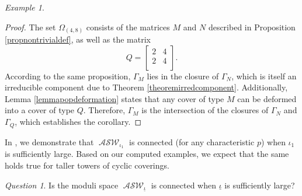 \documentclass{compositio}
\theoremstyle{remark}
\newtheorem{example}[theorem]{Example}
\theoremstyle{remark}
\newtheorem{question}[theorem]{Question}
\DeclareMathOperator{\ASW}{\mathcal{ASW}}
\begin{document}
\begin{example}
\begin{proof}
The set $\Omega_{(4,8)}$ consists of the matrices $M$ and $N$ described in Proposition \ref{propnontrivialdef}, as well as the matrix
\begin{equation*}
Q=\begin{bmatrix}
2 & 4 \\
2 & 4 \\
\end{bmatrix}.
\end{equation*}
According to the same proposition, $\Gamma_M$ lies in the closure of $\Gamma_N$, which is itself an irreducible component due to Theorem \ref{theoremirredcomponent}. Additionally, Lemma \ref{lemmapopdeformation} states that any cover of type $M$ can be deformed into a cover of type $Q$. Therefore, $\Gamma_M$ is the intersection of the closures of $\Gamma_N$ and $\Gamma_Q$, which establishes the corollary.
\end{proof}

\end{example}

In \cite{DANG2020398}, we demonstrate that $\ASW_{\iota_1}$ is connected (for any characteristic $p$) when $\iota_1$ is sufficiently large. Based on our computed examples, we expect that the same holds true for taller towers of cyclic coverings.

\begin{question}
    Is the moduli space $\ASW_{\underline{\iota}}$ is connected when $\underline{\iota}$ is sufficiently large?
\end{question}






\end{document}
